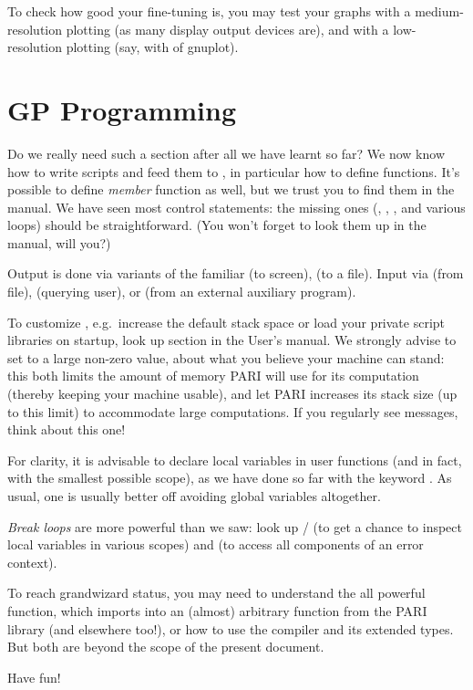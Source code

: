 To check how good your fine-tuning is, you may test your graphs with a
medium-resolution plotting (as many display output devices are), and
with a low-resolution plotting (say, with  of gnuplot).

\section{GP Programming}

Do we really need such a section after all we have learnt so far? We now
know how to write scripts and feed them to , in particular how to
define functions. It's possible to define \emph{member} function as well, but
we trust you to find them in the manual. We have seen most control
statements: the missing ones (, , ,
 and various  loops) should be straightforward. (You
won't forget to look them up in the manual, will you?)

Output is done via variants of the familiar  (to screen),
 (to a file). Input via  (from file), 
(querying user), or  (from an external auxiliary program).

To customize , e.g.~increase the default stack space or load your
private script libraries on startup, look up 
section in the User's manual. We strongly advise to set  to
a large non-zero value, about what you believe your machine can stand: this
both limits the amount of memory PARI will use for its computation (thereby
keeping your machine usable), and let PARI increases its stack size (up to
this limit) to accommodate large computations. If you regularly see  messages, think about this one!

For clarity, it is advisable  to declare local variables in user functions
(and in fact, with the smallest possible scope), as we have done so far with
the keyword . As usual, one is usually better off avoiding global
variables altogether.

\emph{Break loops} are more powerful than we saw: look up  /
 (to get a chance to inspect local variables in various scopes)
and  (to access all components of an error context).

To reach grandwizard status, you may need to understand the all powerful
 function, which imports into  an (almost) arbitrary
function from the PARI library (and elsewhere too!), or how to use the
 compiler and its extended types. But both are beyond the scope of
the present document.

Have fun!
\bye
